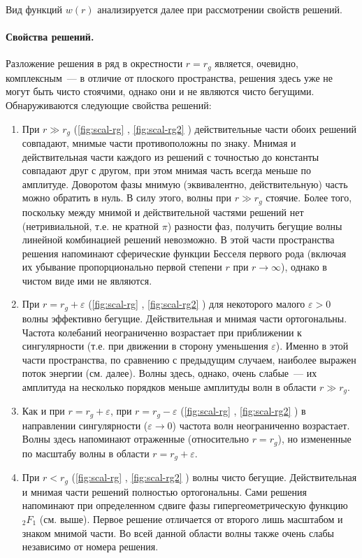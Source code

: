 \documentclass[\docroot/reports/draft/report.tex]{subfiles}
\begin{document}
        Вид функций $w(r)$ анализируется далее при рассмотрении свойств решений.

    \paragraph{Свойства решений.}

        Разложение решения в ряд в окрестности $r = r_g$ является, очевидно, комплексным~--- в отличие от плоского пространства, решения здесь уже не могут быть чисто стоячими, однако они и не являются чисто бегущими. Обнаруживаются следующие свойства решений:
        \begin{enumerate}
            \item При $r \gg r_g$ (\autoref{fig:scal-rg} , \autoref{fig:scal-rg2} ) действительные части обоих решений совпадают, мнимые части противоположны по знаку. Мнимая и действительная части каждого из решений с точностью до константы совпадают друг с другом, при этом мнимая часть всегда меньше по амплитуде. Доворотом фазы мнимую (эквивалентно, действительную) часть можно обратить в нуль. В силу этого, волны при $r \gg r_g$ стоячие. Более того, поскольку между мнимой и действительной частями решений нет (нетривиальной, т.е. не кратной $\pi$) разности фаз, получить бегущие волны линейной комбинацией решений невозможно. В этой части пространства решения напоминают сферические функции Бесселя первого рода (включая их убывание пропорционально первой степени $r$ при $r \to \infty$), однако в чистом виде ими не являются.
            \item При $r = r_g + \varepsilon$ (\autoref{fig:scal-rg} , \autoref{fig:scal-rg2} ) для некоторого малого $\varepsilon > 0$ волны эффективно бегущие. Действительная и мнимая части ортогональны. Частота колебаний неограниченно возрастает при приближении к сингулярности (т.е. при движении в сторону уменьшения $\varepsilon$). Именно в этой части пространства, по сравнению с предыдущим случаем, наиболее выражен поток энергии (см. далее). Волны здесь, однако, очень слабые~--- их амплитуда на несколько порядков меньше амплитуды волн в области $r \gg r_g$.
            \item Как и при $r = r_g + \varepsilon$, при $r = r_g - \varepsilon$ (\autoref{fig:scal-rg} , \autoref{fig:scal-rg2} ) в направлении сингулярности ($\varepsilon \to 0$) частота волн неограниченно возрастает. Волны здесь напоминают отраженные (относительно $r = r_g$), но измененные по масштабу волны в области $r = r_g + \varepsilon$.
            \item При $r < r_g$  (\autoref{fig:scal-rg} , \autoref{fig:scal-rg2} ) волны чисто бегущие. Действительная и мнимая части решений полностью ортогональны. Сами решения напоминают при определенном сдвиге фазы гипергеометрическую функцию ${}_2 F_1$ (см. выше). Первое решение отличается от второго лишь масштабом и знаком мнимой части. Во всей данной области волны также очень слабы независимо от номера решения.
        \end{enumerate}
\end{document}
